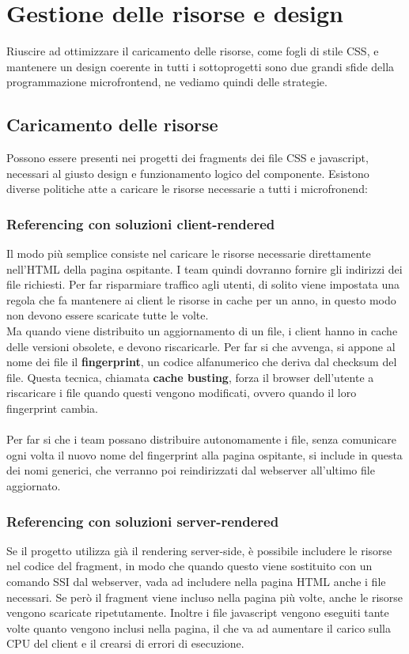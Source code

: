 \chapter{Gestione delle risorse e design}\label{ch:gestionerisorse}
Riuscire ad ottimizzare il caricamento delle risorse, come fogli di stile CSS, 
e mantenere un design coerente in tutti i sottoprogetti sono due
 grandi sfide della programmazione microfrontend, ne vediamo quindi delle strategie.

\section{Caricamento delle risorse}
Possono essere presenti nei progetti dei fragments dei file CSS e javascript, necessari
al giusto design e funzionamento logico del componente. Esistono diverse politiche 
atte a caricare le risorse necessarie a tutti i microfronend:

\subsection{Referencing con soluzioni client-rendered}
Il modo più semplice consiste nel caricare le risorse necessarie direttamente nell'HTML della pagina ospitante.
I team quindi dovranno fornire gli indirizzi dei file richiesti.
Per far risparmiare traffico agli utenti, di solito viene impostata una regola che fa mantenere ai client
le risorse in cache per un anno, in questo modo non devono essere scaricate tutte le volte.
\\Ma quando viene distribuito un aggiornamento di un file, i client hanno in cache delle versioni obsolete, e devono riscaricarle.
Per far si che avvenga, si appone al nome dei file il \textbf{fingerprint}, un codice alfanumerico che deriva dal checksum del file.
Questa tecnica, chiamata \textbf{cache busting}, forza il browser dell'utente a riscaricare i file quando questi vengono modificati,
ovvero quando il loro fingerprint cambia.
\\\\
Per far si che i team possano distribuire autonomamente i file, senza comunicare ogni volta il nuovo nome del
fingerprint alla pagina ospitante, si include in questa dei nomi generici, che verranno poi reindirizzati dal webserver all'ultimo file aggiornato.



\subsection{Referencing con soluzioni server-rendered}
Se il progetto utilizza già il rendering server-side, è possibile includere le risorse nel codice
del fragment, in modo che quando questo viene sostituito con un comando SSI dal webserver, vada ad includere
nella pagina HTML anche i file necessari. Se però il fragment viene incluso nella pagina più volte, anche le risorse vengono 
scaricate ripetutamente. Inoltre i file javascript vengono eseguiti tante volte quanto vengono inclusi nella pagina,
il che va ad aumentare il carico sulla CPU del client e il crearsi di errori di esecuzione.


